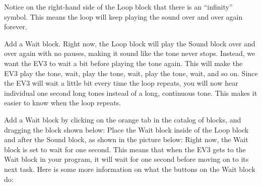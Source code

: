 \documentclass{lessonplan}
\begin{document}
    Notice on the right-hand side of the Loop block that there is an “infinity” symbol. This means the loop will keep playing the sound over and over again forever.
    \par
    Add a Wait block.
    Right now, the Loop block will play the Sound block over and over again with no pauses, making it sound like the tone never stops. Instead, we want the EV3 to wait a bit before playing the tone again. This will make the EV3 play the tone, wait, play the tone, wait, play the tone, wait, and so on. Since the EV3 will wait a little bit every time the loop repeats, you will now hear individual one second long tones instead of a long, continuous tone. This makes it easier to know when the loop repeats.
    \par
    Add a Wait block by clicking on the orange tab in the catalog of blocks, and dragging the block shown below:
    Place the Wait block inside of the Loop block and after the Sound block, as shown in the picture below:
    Right now, the Wait block is set to wait for one second. This means that when the EV3 gets to the Wait block in your program, it will wait for one second before moving on to its next task. Here is some more information on what the buttons on the Wait block do:
\end{document}
